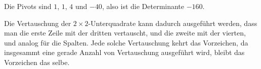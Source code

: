 \begin{loesung}
\begin{teilaufgaben}
Die Pivots sind $1$, $1$, $4$ und $-40$, also ist die Determinante $-160$.

\item Die Vertauschung der $2\times 2$-Unterquadrate kann dadurch
ausgeführt werden, dass man die erste Zeile mit der dritten vertauscht,
und die zweite mit der vierten, und analog für die Spalten. Jede
solche Vertauschung kehrt das Vorzeichen, da insgesammt eine gerade
Anzahl von Vertauschung ausgeführt wird, bleibt das Vorzeichen das
selbe.
\qedhere
\end{teilaufgaben}
\end{loesung}
